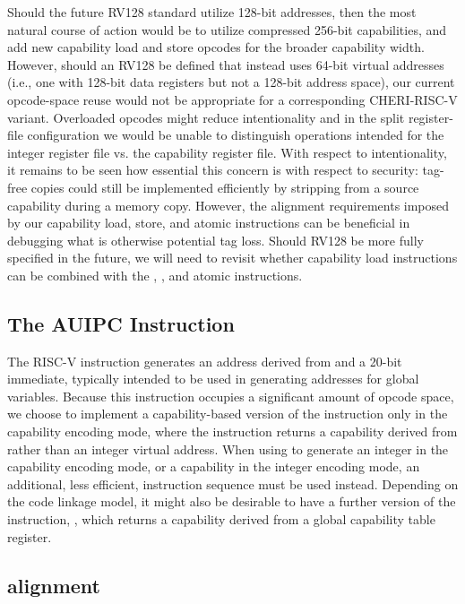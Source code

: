 Should the future RV128 standard utilize 128-bit addresses, then the most
natural course of action would be to utilize compressed 256-bit capabilities,
and add new capability load and store opcodes for the broader capability
width.
However, should an RV128 be defined that instead uses 64-bit virtual
addresses (i.e., one with 128-bit data registers but not a 128-bit address
space), our current opcode-space reuse would not be appropriate for a
corresponding CHERI-RISC-V variant.
Overloaded opcodes might reduce intentionality and in the split register-file
configuration we would be unable to distinguish operations intended for the
integer register file vs. the capability register file.
With respect to intentionality, it remains to be seen how essential this
concern is with respect to security: tag-free copies could still be
implemented efficiently by stripping \cappermLC{} from a source
capability during a memory copy.
However, the alignment requirements imposed by our capability load, store,
and atomic instructions can be beneficial in debugging what is otherwise
potential tag loss.
Should RV128 be more fully specified in the future, we will need to revisit
whether capability load instructions can be combined with the
, , and atomic instructions.

\subsection{The AUIPC Instruction}
\label{section:cheri-risc-v-auipc}

The RISC-V  instruction generates an address derived
from \PC{} and a 20-bit immediate, typically intended to be used in generating
addresses for global variables.
Because this instruction occupies a significant amount of opcode space, we
choose to implement a capability-based version of the instruction only in the
capability encoding mode, where the instruction returns a capability derived
from \PCC{} rather than an integer virtual address.
When using  to generate an integer in the capability
encoding mode, or a capability in the integer encoding mode, an additional,
less efficient, instruction sequence must be used instead.
Depending on the code linkage model, it might also be desirable to have a
further version of the instruction, , which returns
a capability derived from a global capability table register.

\subsection{\PCC{} alignment}
\label{section:cheri-risc-v-pcc-align}

